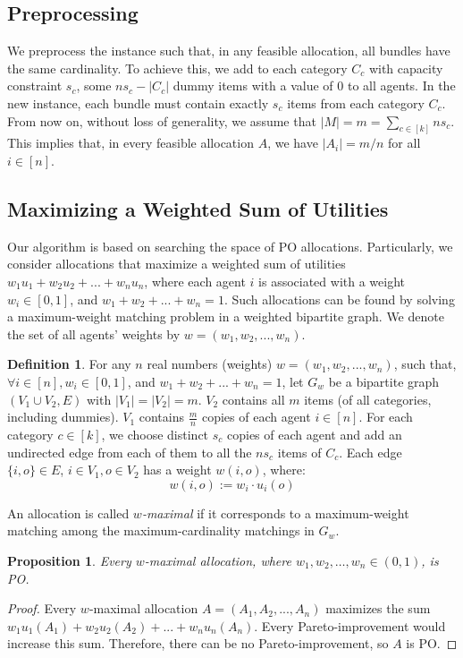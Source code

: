 \documentclass[sigconf]{aamas}
\newtheorem{prop}[theorem]{Proposition}
\theoremstyle{definition}
\newtheorem{definition}[theorem]{Definition}
\begin{document}
\subsection{Preprocessing}
We preprocess the instance such that,
in any feasible allocation, all bundles have the same cardinality.
To achieve this, we add to each category 
$C_c$ with capacity constraint $s_c$,
some $ns_c - |C_c|$ dummy items with a value of $0$ to all agents.
In the new instance, each bundle must contain exactly $s_c$ items from each category $C_c$.
From now on, without loss of generality, we assume that $|M|=m=\sum_{c\in[k]} ns_c$.
This implies that, in every feasible allocation $A$, we have $|A_i| = m/n$ for all $i\in [n]$.

\subsection{Maximizing a Weighted Sum of Utilities}
Our algorithm is based on searching the space of PO allocations. 
Particularly, we consider allocations that maximize a weighted sum of utilities $w_1 u_1 + w_2 u_2 + ... + w_n u_n$, where each agent $i$ is associated with a weight $w_i \in [0,1]$, and $w_1+w_2+...+w_n=1$. Such allocations can be found by solving a maximum-weight matching problem in a weighted bipartite graph. 
We denote the set of all agents' weights by $w=(w_1,w_2,...,w_n)$.

\begin{definition}
For any $n$ real numbers (weights)
$w=(w_1,w_2,...,w_n)$, such that,
$\forall i \in [n], w_i \in [0,1]$, 
and $w_1+w_2+...+w_n=1$,
let 
$G_w$ be a bipartite graph $(V_1 \cup V_2,E)$ with  $|V_1|=|V_2|=m$. 
$V_2$ contains all $m$ items (of all categories, including dummies). $V_1$ contains $\frac{m}{n}$ copies of each agent $i\in [n]$.
For each category $c\in [k]$, we choose distinct $s_c$ copies of each agent and add an undirected edge from each of them to all the $n s_c$ items of $C_c$.
Each edge $\{i,o\} \in E$, $i\in V_1, o\in V_2$ has a weight $w(i,o)$, where: 
\[   
w(i,o) := w_i\cdot u_i(o)
\]

An allocation is called \emph{$w$-maximal} if it corresponds to a maximum-weight matching among the maximum-cardinality matchings in $G_w$.
\end{definition}

\begin{prop}
\label{all-PO}
Every $w$-maximal allocation, where $w_1,w_2,\ldots\allowbreak,w_n\in (0,1)$, is PO.
\end{prop}
\begin{proof}
Every $w$-maximal allocation $A=(A_1,A_2,...,A_n)$ maximizes the sum $w_1u_1(A_1)+w_2u_2(A_2)+...+w_nu_n(A_n)$.
Every Pareto-improvement would increase this sum. Therefore, there can be no Pareto-improvement, so $A$ is PO.
\end{proof}
\end{document}
